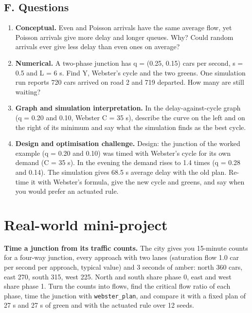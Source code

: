 \documentclass[11pt,a4paper]{article}
\begin{document}
\subsection*{F. Questions}
\begin{enumerate}[nosep]
\item \textbf{Conceptual.} Even and Poisson arrivals have the same average flow, yet Poisson arrivals give more delay and longer queues. Why? Could random arrivals ever give less delay than even ones on average?
\item \textbf{Numerical.} A two-phase junction has q = (0.25, 0.15) cars per second, s = 0.5 and L = 6 s. Find Y, Webster's cycle and the two greens. One simulation run reports 720 cars arrived on road 2 and 719 departed. How many are still waiting?
\item \textbf{Graph and simulation interpretation.} In the delay-against-cycle graph (q = 0.20 and 0.10, Webster C = 35 s), describe the curve on the left and on the right of its minimum and say what the simulation finds as the best cycle.
\item \textbf{Design and optimisation challenge.} Design: the junction of the worked example (q = 0.20 and 0.10) was timed with Webster's cycle for its own demand (C = 35 s). In the evening the demand rises to 1.4 times (q = 0.28 and 0.14). The simulation gives 68.5 s average delay with the old plan. Re-time it with Webster's formula, give the new cycle and greens, and say when you would prefer an actuated rule.
\end{enumerate}

\section{Real-world mini-project}
\textbf{Time a junction from its traffic counts.} The city gives you 15-minute counts for a four-way junction, every approach with two lanes (saturation flow 1.0 car per second per approach, typical value) and 3 seconds of amber: north 360 cars, east 270, south 315, west 225. North and south share phase 0, east and west share phase 1. Turn the counts into flows, find the critical flow ratio of each phase, time the junction with \texttt{webster\_plan}, and compare it with a fixed plan of 27 s and 27 s of green and with the actuated rule over 12 seeds.
\end{document}
